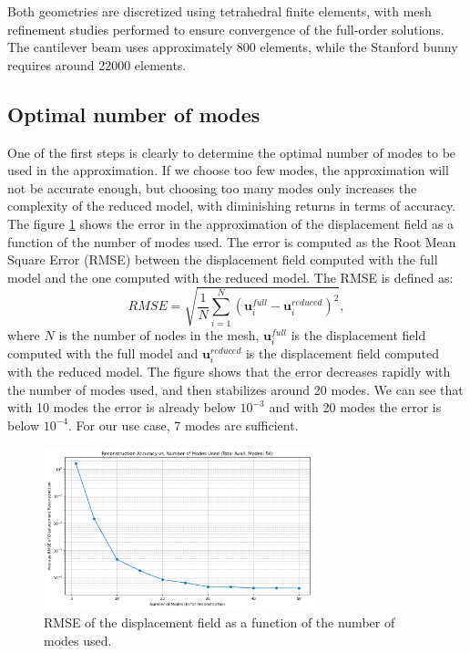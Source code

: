 Both geometries are discretized using tetrahedral finite elements, with mesh refinement studies performed to ensure convergence of the full-order solutions. The cantilever beam uses approximately 800 elements, while the Stanford bunny requires around 22000 elements.
\subsection{Optimal number of modes}
\label{sec:optimal_number_modes}
One of the first steps is clearly to determine the optimal number of modes to be used in the approximation. If we choose too few modes, the approximation will not be accurate enough, but choosing too many modes only increases the complexity of the reduced model, with diminishing returns in terms of accuracy. The figure \ref{fig:optimal_number_modes} shows the error in the approximation of the displacement field as a function of the number of modes used. The error is computed as the Root Mean Square Error (RMSE) between the displacement field computed with the full model and the one computed with the reduced model. The RMSE is defined as:
\begin{equation}
    RMSE = \sqrt{\frac{1}{N}\sum_{i=1}^N (\bm{u}_i^{full} - \bm{u}_i^{reduced})^2},
\end{equation}
where $N$ is the number of nodes in the mesh, $\bm{u}_i^{full}$ is the displacement field computed with the full model and $\bm{u}_i^{reduced}$ is the displacement field computed with the reduced model. The figure shows that the error decreases rapidly with the number of modes used, and then stabilizes around 20 modes. We can see that with 10 modes the error is already below \(10^{-3}\) and with 20 modes the error is below \(10^{-4}\). For our use case, 7 modes are sufficient.
\begin{figure}[H]
    \centering
    \includegraphics[width=0.7\textwidth]{Images/rmse_vs_modes.png}
    \caption{RMSE of the displacement field as a function of the number of modes used.}
    \label{fig:optimal_number_modes}
\end{figure}

